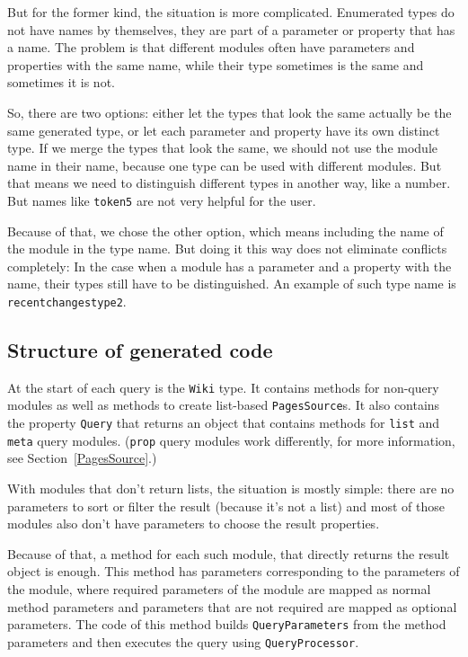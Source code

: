 But for the former kind, the situation is more complicated.
Enumerated types do not have names by themselves, they are part of a parameter or property that has a name.
The problem is that different modules often have parameters and properties with the same name,
while their type sometimes is the same and sometimes it is not.

So, there are two options: either let the types that look the same actually be the same generated type,
or let each parameter and property have its own distinct type.
If we merge the types that look the same, we should not use the module name in their name,
because one type can be used with different modules.
But that means we need to distinguish different types in another way, like a number.
But names like \lstinline{token5} are not very helpful for the user.

Because of that, we chose the other option, which means including the name of the module in the type name.
But doing it this way does not eliminate conflicts completely:
In the case when a module has a parameter and a property with the name,
their types still have to be distinguished.
An example of such type name is \lstinline{recentchangestype2}.

\subsection{Structure of generated code}
\label{ltwcg-structure}

At the start of each query is the \lstinline{Wiki} type.
It contains methods for non-query modules as well as methods to create list-based \lstinline{PagesSource}s.
It also contains the property \lstinline{Query} that returns an object that contains methods for
\texttt{list} and \texttt{meta} query modules.
(\texttt{prop} query modules work differently, for more information, see Section~\ref{PagesSource}.)

\medskip

With modules that don't return lists, the situation is mostly simple:
there are no parameters to sort or filter the result (because it's not a list)
and most of those modules also don't have parameters to choose the result properties.

Because of that, a method for each such module, that directly returns the result object is enough.
This method has parameters corresponding to the parameters of the module,
where required parameters of the module are mapped as normal method parameters
and parameters that are not required are mapped as optional parameters.
The code of this method builds \lstinline{QueryParameters} from the method parameters
and then executes the query using \lstinline{QueryProcessor}.

